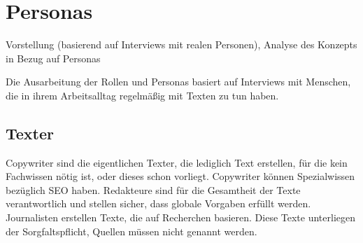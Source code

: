 \section{Personas}\label{l:personas}

Vorstellung (basierend auf Interviews mit realen Personen), Analyse des Konzepts in Bezug auf Personas

Die Ausarbeitung der Rollen und Personas basiert auf Interviews mit Menschen, die in ihrem Arbeitsalltag regelmäßig mit Texten zu tun haben.


\subsection{Texter}

Copywriter sind die eigentlichen Texter, die lediglich Text erstellen, für die kein Fachwissen nötig ist, oder dieses schon vorliegt. Copywriter können Spezialwissen bezüglich SEO haben. Redakteure sind für die Gesamtheit der Texte verantwortlich und stellen sicher, dass globale Vorgaben erfüllt werden. Journalisten erstellen Texte, die auf Recherchen basieren. Diese Texte unterliegen der Sorgfaltspflicht, Quellen müssen nicht genannt werden. 
